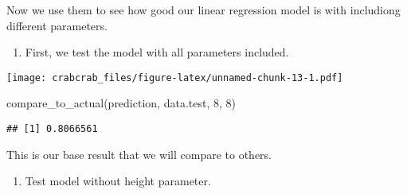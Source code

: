 \documentclass[
]{article}
\newenvironment{Shaded}{\begin{snugshade}}{\end{snugshade}}
\newcommand{\AttributeTok}[1]{\textcolor[rgb]{0.77,0.63,0.00}{#1}}
\newcommand{\DecValTok}[1]{\textcolor[rgb]{0.00,0.00,0.81}{#1}}
\newcommand{\FunctionTok}[1]{\textcolor[rgb]{0.00,0.00,0.00}{#1}}
\newcommand{\NormalTok}[1]{#1}
\newcommand{\OtherTok}[1]{\textcolor[rgb]{0.56,0.35,0.01}{#1}}
\newcommand{\SpecialCharTok}[1]{\textcolor[rgb]{0.00,0.00,0.00}{#1}}
\newcommand{\StringTok}[1]{\textcolor[rgb]{0.31,0.60,0.02}{#1}}
\providecommand{\tightlist}{%
  \setlength{\itemsep}{0pt}\setlength{\parskip}{0pt}}
\begin{document}
Now we use them to see how good our linear regression model is with
includiong different parameters.

\begin{enumerate}
\def\labelenumi{\arabic{enumi}.}
\tightlist
\item
  First, we test the model with all parameters included.
\end{enumerate}

\begin{Shaded}
\end{Shaded}

\texttt{[image: crabcrab\_files/figure-latex/unnamed-chunk-13-1.pdf]}

\begin{Shaded}
\begin{Highlighting}[]
\FunctionTok{compare\_to\_actual}\NormalTok{(prediction, data.test, }\DecValTok{8}\NormalTok{, }\DecValTok{8}\NormalTok{)}
\end{Highlighting}
\end{Shaded}

\begin{verbatim}
## [1] 0.8066561
\end{verbatim}

This is our base result that we will compare to others.

\begin{enumerate}
\def\labelenumi{\arabic{enumi}.}
\setcounter{enumi}{1}
\tightlist
\item
  Test model without height parameter.
\end{enumerate}
\end{document}

